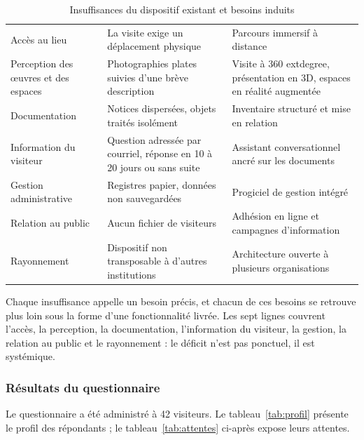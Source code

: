 \begin{table}[!ht]
\centering
\caption{Insuffisances du dispositif existant et besoins induits}
\label{tab:existant}
\small
\begin{tabularx}{\textwidth}{|L{4.4cm}|X|L{3.4cm}|}
\hline
{}
 &  &  \\ \hline
Accès au lieu & La visite exige un déplacement physique & Parcours immersif à distance \\ \hline
Perception des œuvres et des espaces & Photographies plates suivies d'une brève description & Visite à 360	extdegree{}, présentation en 3D, espaces en réalité augmentée \\ \hline
Documentation & Notices dispersées, objets traités isolément & Inventaire structuré et mise en relation \\ \hline
Information du visiteur & Question adressée par courriel, réponse en 10 à 20 jours ou sans suite & Assistant conversationnel ancré sur les documents \\ \hline
Gestion administrative & Registres papier, données non sauvegardées & Progiciel de gestion intégré \\ \hline
Relation au public & Aucun fichier de visiteurs & Adhésion en ligne et campagnes d'information \\ \hline
Rayonnement & Dispositif non transposable à d'autres institutions & Architecture ouverte à plusieurs organisations \\ \hline
\end{tabularx}
\end{table}

Chaque insuffisance appelle un besoin précis, et chacun de ces besoins se
retrouve plus loin sous la forme d'une fonctionnalité livrée. Les sept lignes
couvrent l'accès, la perception, la documentation, l'information du visiteur, la
gestion, la relation au public et le rayonnement : le déficit n'est pas
ponctuel, il est systémique.

\subsubsection{Résultats du questionnaire}

Le questionnaire a été administré à 42 visiteurs. Le
tableau~\ref{tab:profil} présente le profil des
répondants ; le tableau~\ref{tab:attentes} ci-après expose leurs attentes.

